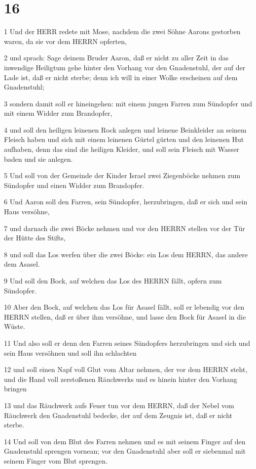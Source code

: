 \chapter{16}

\par 1 Und der HERR redete mit Mose, nachdem die zwei Söhne Aarons gestorben waren, da sie vor dem HERRN opferten,
\par 2 und sprach: Sage deinem Bruder Aaron, daß er nicht zu aller Zeit in das inwendige Heiligtum gehe hinter den Vorhang vor den Gnadenstuhl, der auf der Lade ist, daß er nicht sterbe; denn ich will in einer Wolke erscheinen auf dem Gnadenstuhl;
\par 3 sondern damit soll er hineingehen: mit einem jungen Farren zum Sündopfer und mit einem Widder zum Brandopfer,
\par 4 und soll den heiligen leinenen Rock anlegen und leinene Beinkleider an seinem Fleisch haben und sich mit einem leinenen Gürtel gürten und den leinenen Hut aufhaben, denn das sind die heiligen Kleider, und soll sein Fleisch mit Wasser baden und sie anlegen.
\par 5 Und soll von der Gemeinde der Kinder Israel zwei Ziegenböcke nehmen zum Sündopfer und einen Widder zum Brandopfer.
\par 6 Und Aaron soll den Farren, sein Sündopfer, herzubringen, daß er sich und sein Haus versöhne,
\par 7 und darnach die zwei Böcke nehmen und vor den HERRN stellen vor der Tür der Hütte des Stifts,
\par 8 und soll das Los werfen über die zwei Böcke: ein Los dem HERRN, das andere dem Asasel.
\par 9 Und soll den Bock, auf welchen das Los des HERRN fällt, opfern zum Sündopfer.
\par 10 Aber den Bock, auf welchen das Los für Asasel fällt, soll er lebendig vor den HERRN stellen, daß er über ihm versöhne, und lasse den Bock für Asasel in die Wüste.
\par 11 Und also soll er denn den Farren seines Sündopfers herzubringen und sich und sein Haus versöhnen und soll ihn schlachten
\par 12 und soll einen Napf voll Glut vom Altar nehmen, der vor dem HERRN steht, und die Hand voll zerstoßenen Räuchwerks und es hinein hinter den Vorhang bringen
\par 13 und das Räuchwerk aufs Feuer tun vor dem HERRN, daß der Nebel vom Räuchwerk den Gnadenstuhl bedecke, der auf dem Zeugnis ist, daß er nicht sterbe.
\par 14 Und soll von dem Blut des Farren nehmen und es mit seinem Finger auf den Gnadenstuhl sprengen vornean; vor den Gnadenstuhl aber soll er siebenmal mit seinem Finger vom Blut sprengen.
